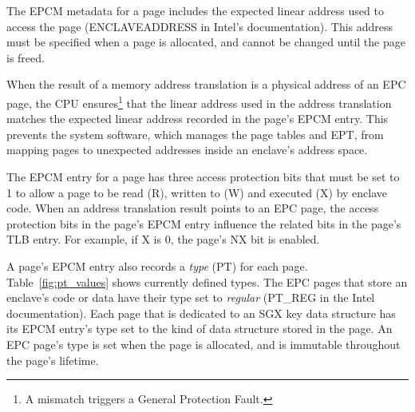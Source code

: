 
The EPCM metadata for a page includes the expected linear address used to
access the page (ENCLAVEADDRESS in Intel's documentation). This address must be
specified when a page is allocated, and cannot be changed until the page is
freed.

When the result of a memory address translation is a physical address of an EPC
page, the CPU ensures\footnote{A mismatch triggers a General Protection Fault.}
that the linear address used in the address translation matches the expected
linear address recorded in the page's EPCM entry. This prevents the system
software, which manages the page tables and EPT, from mapping pages to
unexpected addresses inside an enclave's address space.

The EPCM entry for a page has three access protection bits that must be set to
1 to allow a page to be read (R), written to (W) and executed (X) by enclave
code. When an address translation result points to an EPC page, the access
protection bits in the page's EPCM entry influence the related bits in the
page's TLB entry. For example, if X is 0, the page's NX bit is enabled.

A page's EPCM entry also records a \textit{type} (PT) for each page.
Table~\ref{fig:pt_values} shows currently defined types. The EPC pages that
store an enclave's code or data have their type set to \textit{regular}
(PT\_REG in the Intel documentation). Each page that is dedicated to an SGX key
data structure has its EPCM entry's type set to the kind of data structure
stored in the page.  An EPC page's type is set when the page is allocated, and
is immutable throughout the page's lifetime.

\begin{table}[hbt]
  \caption{Values of the PT (page type) field in an EPCM entry.}
  \label{fig:pt_values}
\end{table}


